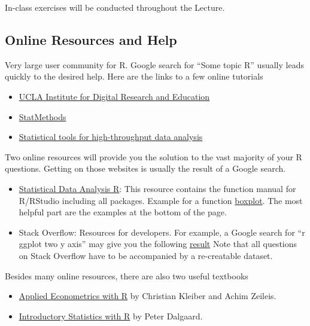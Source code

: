 \documentclass[
]{article}
\providecommand{\tightlist}{%
  \setlength{\itemsep}{0pt}\setlength{\parskip}{0pt}}
\begin{document}
In-class exercises will be conducted throughout the Lecture.

\hypertarget{online-resources-and-help}{%
\subsection{Online Resources and Help}\label{online-resources-and-help}}

Very large user community for R. Google search for ``Some topic R'' usually leads quickly to the desired help.
Here are the links to a few online tutorials

\begin{itemize}
\tightlist
\item
  \href{http://stats.idre.ucla.edu/r/}{UCLA Institute for Digital Research and Education}
\item
  \href{https://www.statmethods.net/}{StatMethods}
\item
  \href{http://www.sthda.com/english/}{Statistical tools for high-throughput data analysis}
\end{itemize}

Two online resources will provide you the solution to the vast majority of your R questions. Getting on those websites is usually the result of a Google search.

\begin{itemize}
\tightlist
\item
  \href{https://stat.ethz.ch/R-manual/}{Statistical Data Analysis R}: This resource contains the function manual for R/RStudio including all packages. Example for a function \href{https://stat.ethz.ch/R-manual/R-devel/library/graphics/html/boxplot.html}{boxplot}. The most helpful part are the examples at the bottom of the page.
\item
  Stack Overflow: Resources for developers. For example, a Google search for ``r ggplot two y axis'' may give you the following \href{https://stackoverflow.com/questions/3099219/plot-with-2-y-axes-one-y-axis-on-the-left-and-another-y-axis-on-the-right}{result} Note that all questions on Stack Overflow have to be accompanied by a re-creatable dataset.
\end{itemize}

Besides many online resources, there are also two useful textbooks

\begin{itemize}
\tightlist
\item
  \href{https://link.springer.com/book/10.1007/978-0-387-77318-6}{Applied Econometrics with R} by Christian Kleiber and Achim Zeileis.
\item
  \href{https://link.springer.com/book/10.1007/978-0-387-79054-1\%5D}{Introductory Statistics with R} by Peter Dalgaard.
\end{itemize}
\end{document}
